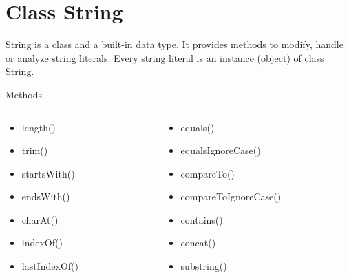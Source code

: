 \documentclass[10pt, compress]{beamer}
\begin{document}
\section{Class String}

\begin{slide}
	String is a class and a built-in data type. It provides methods to modify, handle or analyze string literals. Every string literal is an instance (object) of class String.
	\begin{block}{Methods}
		\begin{columns}
			\begin{column}{0.5\textwidth}
				\begin{itemize}
					\item[] length()
					\item[] trim()
					\item[] startsWith()
					\item[] endsWith()
					\item[] charAt()
					\item[] indexOf()
					\item[] lastIndexOf()
				\end{itemize}
			\end{column}
			\begin{column}{0.5\textwidth}
				\begin{itemize}
					\item[] equals()
					\item[] equalsIgnoreCase()
					\item[] compareTo()
					\item[] compareToIgnoreCase()
					\item[] contains()
					\item[] concat()
					\item[] substring()
				\end{itemize}
			\end{column}
		\end{columns}
	\end{block}
\end{slide}
\end{document}
